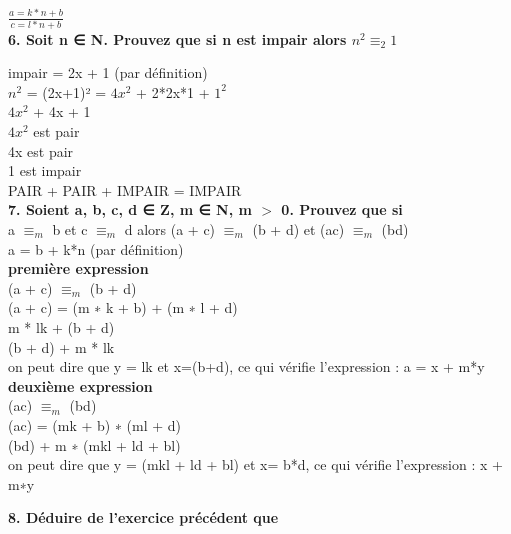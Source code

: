 $\frac{a=k*n+b}{c= l*n + b}$ \\


\vspace{10mm}
\textbf{6. Soit n ∈ N. Prouvez que si n est impair alors $n^{2} ≡_{2} 1$}

\vspace{4mm}
impair = 2x + 1 (par définition) \\

$n^{2}$ = (2x+1)² = $4x^{2}$ + 2*2x*1 + $1^{2}$ \\
$4x^{2}$ + 4x + 1 \\

$4x^{2}$ est pair \\
4x est pair \\
1 est impair \\

PAIR + PAIR + IMPAIR = IMPAIR \\

\vspace{6mm}
\textbf{7. Soient a, b, c, d ∈ Z, m ∈ N, m $>$ 0. Prouvez que si} \\

a $≡_{m}$ b et c $≡_{m}$ d alors (a + c) $≡_{m}$ (b + d) et (ac) $≡_{m}$ (bd) \\

a = b + k*n (par définition) \\

\textbf{première expression} \\

(a + c) $≡_{m}$ (b + d) \\
(a + c) = (m ∗ k + b) + (m ∗ l + d) \\
m * lk + (b + d) \\
(b + d) + m * lk  \\

on peut dire que y = lk et x=(b+d), ce qui vérifie l'expression : a = x + m*y  \\


\textbf{deuxième expression} \\

(ac) $≡_{m}$ (bd) \\
(ac) = (mk + b) ∗ (ml + d) \\
(bd) + m ∗ (mkl + ld + bl)  \\

on peut dire que y = (mkl + ld + bl) et x= b*d, ce qui vérifie l'expression : x + m∗y \\
\newpage

\textbf{8. Déduire de l’exercice précédent que} \\

